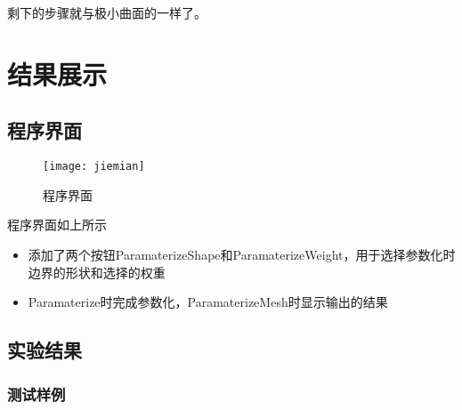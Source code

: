 \documentclass{article}
\begin{document}
    剩下的步骤就与极小曲面的一样了。
    
  
	\section{结果展示}
	
	 \subsection{程序界面}
	 
	 \begin{figure}[H]
	 	\begin{center}
	 		
	 		\texttt{[image: jiemian]}
	 		
	 		\caption{程序界面} \label{jiemian.label}
	 	\end{center}
	 \end{figure}
 
  程序界面如上所示
   \begin{itemize}
 	\item  添加了两个按钮ParamaterizeShape和ParamaterizeWeight，用于选择参数化时边界的形状和选择的权重
   \end{itemize}

   \begin{itemize}
	\item  Paramaterize时完成参数化，ParamaterizeMesh时显示输出的结果
\end{itemize}
	 

	 
	      \subsection{实验结果}
	      
	  
    
     \subsubsection{测试样例}
    
\end{document}

